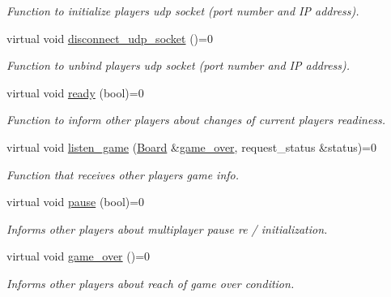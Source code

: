 \begin{DoxyCompactItemize}
\begin{DoxyCompactList}\small\item\em Function to initialize player\textquotesingle{}s udp socket (port number and IP address). \end{DoxyCompactList}\item 
\mbox{\label{classPlayer_aa6feec282ee0820bb917475d56145d9e}} 
virtual void \hyperlink{classPlayer_aa6feec282ee0820bb917475d56145d9e}{disconnect\+\_\+udp\+\_\+socket} ()=0
\begin{DoxyCompactList}\small\item\em Function to unbind player\textquotesingle{}s udp socket (port number and IP address). \end{DoxyCompactList}\item 
\mbox{\label{classPlayer_a0122743c67759e402cb32103c58dd49e}} 
virtual void \hyperlink{classPlayer_a0122743c67759e402cb32103c58dd49e}{ready} (bool)=0
\begin{DoxyCompactList}\small\item\em Function to inform other players about changes of current player\textquotesingle{}s readiness. \end{DoxyCompactList}\item 
virtual void \hyperlink{classPlayer_a24a94f532e7ea75b3429795e34902a94}{listen\+\_\+game} (\hyperlink{classBoard}{Board} \&\hyperlink{classPlayer_ad64a3173a2f09450f91100bfcb9387a9}{game\+\_\+over}, request\+\_\+status \&status)=0
\begin{DoxyCompactList}\small\item\em Function that receives other players\textquotesingle{} game info. \end{DoxyCompactList}\item 
\mbox{\label{classPlayer_a28dc835372d92c9d658f8c45304796bf}} 
virtual void \hyperlink{classPlayer_a28dc835372d92c9d658f8c45304796bf}{pause} (bool)=0
\begin{DoxyCompactList}\small\item\em Informs other players about multiplayer pause re / initialization. \end{DoxyCompactList}\item 
\mbox{\label{classPlayer_ad64a3173a2f09450f91100bfcb9387a9}} 
virtual void \hyperlink{classPlayer_ad64a3173a2f09450f91100bfcb9387a9}{game\+\_\+over} ()=0
\begin{DoxyCompactList}\small\item\em Informs other players about reach of game over condition. \end{DoxyCompactList}\end{DoxyCompactItemize}
